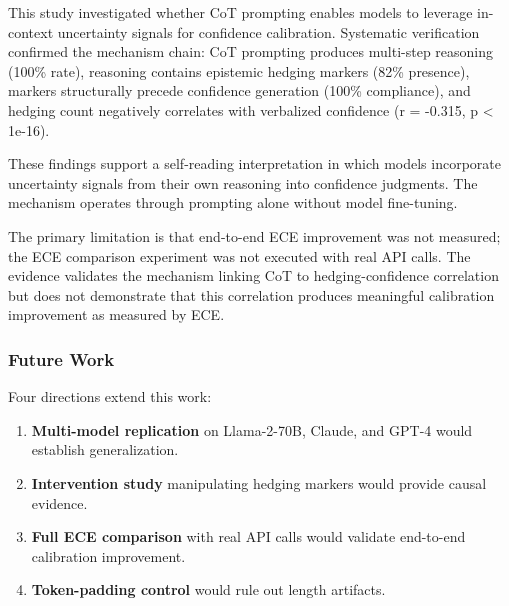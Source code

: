 
This study investigated whether CoT prompting enables models to leverage in-context uncertainty signals for confidence calibration. Systematic verification confirmed the mechanism chain: CoT prompting produces multi-step reasoning (100\% rate), reasoning contains epistemic hedging markers (82\% presence), markers structurally precede confidence generation (100\% compliance), and hedging count negatively correlates with verbalized confidence (r = -0.315, p < 1e-16).

These findings support a self-reading interpretation in which models incorporate uncertainty signals from their own reasoning into confidence judgments. The mechanism operates through prompting alone without model fine-tuning.

The primary limitation is that end-to-end ECE improvement was not measured; the ECE comparison experiment was not executed with real API calls. The evidence validates the mechanism linking CoT to hedging-confidence correlation but does not demonstrate that this correlation produces meaningful calibration improvement as measured by ECE.

\subsubsection{Future Work}

Four directions extend this work:

\begin{enumerate}
\item \textbf{Multi-model replication} on Llama-2-70B, Claude, and GPT-4 would establish generalization.
\item \textbf{Intervention study} manipulating hedging markers would provide causal evidence.
\item \textbf{Full ECE comparison} with real API calls would validate end-to-end calibration improvement.
\item \textbf{Token-padding control} would rule out length artifacts.
\end{enumerate}
